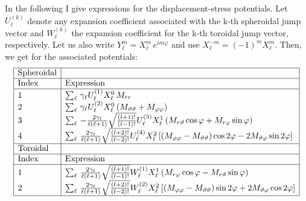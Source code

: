\documentclass[12pt,a4paper]{article}
\begin{document}
In the following I give expressions for the displacement-stress potentials. Let $U_\ell^{(k)}$ denote any expansion coefficient associated with the k-th spheroidal jump vector and $W_\ell^{(k)}$ the expansion coefficient for the k-th toroidal jump vector, respectively. Let us also write $Y_{\ell}^{m} = X_{\ell}^{m}\,e^{im\varphi}$ and use $X_{\ell}^{-m}= (-1)^m X_{\ell}^{m}$. Then, we get for the associated potentials:
\begin{displaymath}
\begin{array}{|l|l|}\hline
\mbox{Spheroidal} & \\ \hline
\mbox{Index} & \mbox{Expression} \\ \hline
1 & \sum_\ell\,\gamma_\ell U_\ell^{(1)}X_{\ell}^{0}\,M_{rr} \\
2 & \sum_\ell\,\gamma_\ell U_\ell^{(2)}X_{\ell}^{0}\,(M_{\vartheta\vartheta}+M_{\varphi\varphi}) \\
3 & \sum_\ell\,-\frac{2\gamma_\ell}{\ell(\ell+1)}\sqrt{\frac{(l+1)!}{(l-1)!}} U_\ell^{(3)} X_{\ell}^{1} \left(M_{r \vartheta}\cos\varphi+M_{r \varphi}\sin\varphi\right) \\
4 & \sum_\ell\,\frac{2\gamma_\ell}{\ell(\ell+1)}\sqrt{\frac{(l+2)!}{(l-2)!}} U_\ell^{(4)} X_{\ell}^{2}\left[(M_{\varphi\varphi}-M_{\vartheta\vartheta})\cos 2\varphi - 2M_{\vartheta\varphi}\sin 2\varphi\right] \\ \hline
\mbox{Toroidal} & \\ \hline
\mbox{Index} & \mbox{Expression} \\ \hline
1 & \sum_\ell\,\frac{2\gamma_\ell}{\ell(\ell+1)}\sqrt{\frac{(l+1)!}{(l-1)!}} W_\ell^{(1)} X_{\ell}^{1} \left(M_{r\varphi}\cos\varphi-M_{r \vartheta}\sin\varphi\right) \\
2 & \sum_\ell\,\frac{2\gamma_\ell}{\ell(\ell+1)}\sqrt{\frac{(l+2)!}{(l-2)!}} W_\ell^{(2)} X_{\ell}^{2} \left[(M_{\varphi\varphi}-M_{\vartheta\vartheta})\sin 2\varphi + 2M_{\vartheta\varphi}\cos 2\varphi\right] \\ \hline
\end{array}
\end{displaymath}
\end{document}
